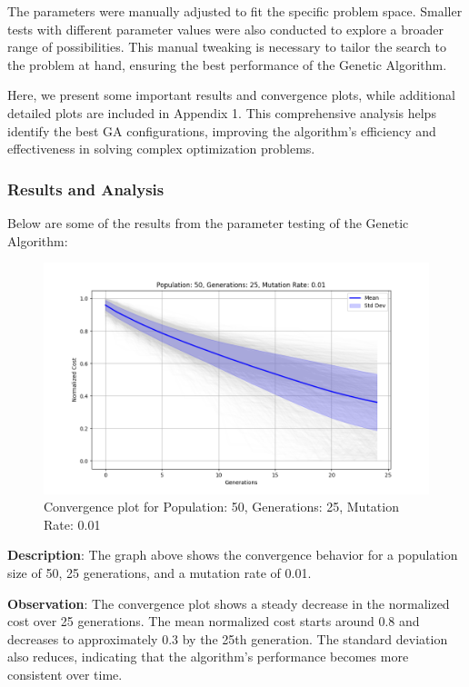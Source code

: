 \documentclass[
]{article}
\begin{document}
    The parameters were manually adjusted to fit the specific problem space.
    Smaller tests with different parameter values were also conducted to explore a broader range of possibilities. This manual tweaking is necessary to tailor the search to the problem at hand, ensuring the best performance of the Genetic Algorithm.


    Here, we present some important results and convergence plots, while additional detailed plots are included in Appendix 1. This comprehensive analysis helps identify the best GA configurations, improving the algorithm's efficiency and effectiveness in solving complex optimization problems.

    \subsubsection{Results and Analysis}

    Below are some of the results from the parameter testing of the Genetic Algorithm:

    \begin{figure}[H]
        \centering
        \includegraphics[width=\textwidth]{genetic_algorithm/Population_50_Generations_25_MutationRate_0.01}
        \caption{Convergence plot for Population: 50, Generations: 25, Mutation Rate: 0.01}
        \label{fig:ga_50_25_01}
    \end{figure}

    \textbf{Description}: The graph above shows the convergence behavior for a population size of 50, 25 generations, and a mutation rate of 0.01.

    \textbf{Observation}: The convergence plot shows a steady decrease in the normalized cost over 25 generations. The mean normalized cost starts around 0.8 and decreases to approximately 0.3 by the 25th generation. The standard deviation also reduces, indicating that the algorithm's performance becomes more consistent over time.
\end{document}
